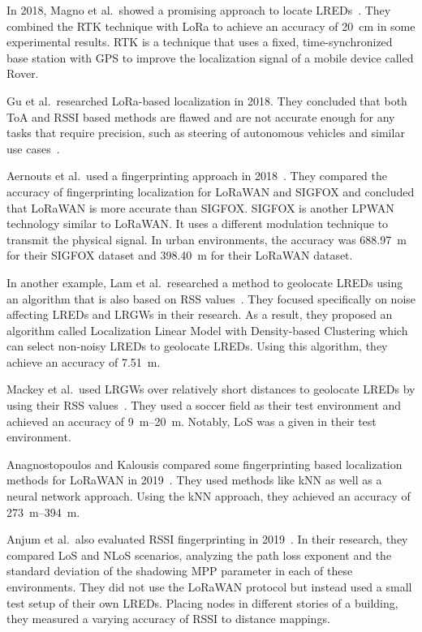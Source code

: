 In 2018, Magno et al.\ showed a promising approach to locate \aclp{LRED}~\cite{magno_poster_2018}.
They combined the \acf{RTK} technique with \ac{LoRa} to achieve an accuracy of \SI{20}{\centi\meter} in some experimental results.
\ac{RTK} is a technique that uses a fixed, time-synchronized base station with \ac{GPS} to improve the localization signal of a mobile device called Rover.

Gu et al.\ researched \ac{LoRa}-based localization in 2018.
They concluded that both \ac{ToA} and \ac{RSSI} based methods are flawed and are not accurate enough for any tasks that require precision, such as steering of autonomous vehicles and similar use cases~\cite{gu_lora-based_2018}.

Aernouts et al.\ used a fingerprinting approach in 2018~\cite{aernouts_sigfox_2018}.
They compared the accuracy of fingerprinting localization for \ac{LoRaWAN} and SIGFOX and concluded that \ac{LoRaWAN} is more accurate than SIGFOX.
SIGFOX is another \ac{LPWAN} technology similar to \ac{LoRaWAN}.
It uses a different modulation technique to transmit the physical signal.
In urban environments, the accuracy was \SI{688.97}{\meter} for their SIGFOX dataset and \SI{398.40}{\meter} for their LoRaWAN dataset.

In another example, Lam et al.~researched a method to geolocate \aclp{LRED} using an algorithm that is also based on \ac{RSS} values~\cite{lam_new_2018}.
They focused specifically on noise affecting \aclp{LRED} and \aclp{LRGW} in their research.
As a result, they proposed an algorithm called Localization Linear Model with Density-based Clustering which can select non-noisy \aclp{LRED} to geolocate \aclp{LRED}.
Using this algorithm, they achieve an accuracy of \SI{7.51}{\meter}.

Mackey et al.~used \aclp{LRGW} over relatively short distances to geolocate \aclp{LRED} by using their \ac{RSS} values~\cite{mackey_lora-based_2019}.
They used a soccer field as their test environment and achieved an accuracy of \SIrange{9}{20}{\meter}.
Notably, \ac{LoS} was a given in their test environment.

Anagnostopoulos and Kalousis compared some fingerprinting based localization methods for \ac{LoRaWAN} in 2019~\cite{anagnostopoulos_reproducible_2019}.
They used methods like \ac{kNN} as well as a neural network approach.
Using the \ac{kNN} approach, they achieved an accuracy of \SIrange{273}{394}{\meter}.

Anjum et al.\ also evaluated \ac{RSSI} fingerprinting in 2019~\cite{anjum_analysis_2019}.
In their research, they compared \ac{LoS} and \ac{NLoS} scenarios, analyzing the path loss exponent and the standard deviation of the shadowing \ac{MPP} parameter in each of these environments.
They did not use the \ac{LoRaWAN} protocol but instead used a small test setup of their own \aclp{LRED}.
Placing nodes in different stories of a building, they measured a varying accuracy of \ac{RSSI} to distance mappings.

